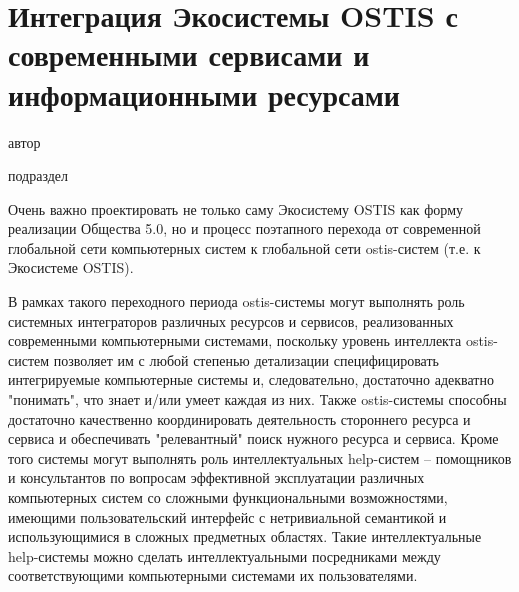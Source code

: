 \chapter{Интеграция Экосистемы OSTIS с современными сервисами и информационными ресурсами}
\label{chapter_integration}

\vspace{-7\baselineskip}

\begin{SCn}
\begin{scnrelfromlist}{автор}
\end{scnrelfromlist}

\bigskip


\bigskip

\begin{scnrelfromlist}{подраздел}
\end{scnrelfromlist}

\end{SCn}

Очень важно проектировать не только саму Экосистему OSTIS как форму реализации Общества 5.0, но и процесс поэтапного перехода от современной глобальной сети компьютерных систем к глобальной сети ostis-систем (т.е. к Экосистеме OSTIS).

В рамках такого переходного периода ostis-системы могут выполнять роль системных интеграторов различных ресурсов и сервисов, реализованных современными компьютерными системами, поскольку уровень интеллекта ostis-систем позволяет им с любой степенью детализации специфицировать интегрируемые компьютерные системы и, следовательно, достаточно адекватно "понимать", что знает и/или умеет каждая из них. 
Также ostis-системы способны достаточно качественно координировать деятельность стороннего ресурса и сервиса и обеспечивать "релевантный" поиск нужного ресурса и сервиса. 
Кроме того системы могут выполнять роль интеллектуальных help-систем – помощников и консультантов по вопросам эффективной эксплуатации различных компьютерных систем со сложными функциональными возможностями, имеющими пользовательский интерфейс с нетривиальной семантикой и использующимися в сложных предметных областях. 
Такие интеллектуальные help-системы можно сделать интеллектуальными посредниками между соответствующими компьютерными системами их пользователями.

